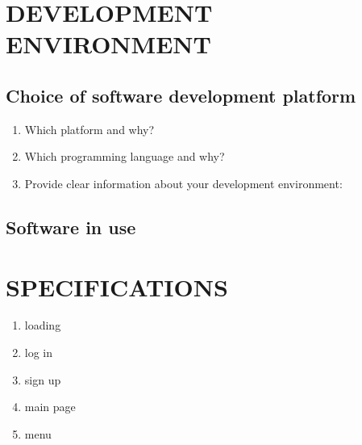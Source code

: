 \documentclass[conference]{IEEEtran}
\begin{document}
\section{DEVELOPMENT ENVIRONMENT}

\subsection{Choice of software development platform}
	\begin{enumerate}
	\item Which platform and why?\\
	
	\item Which programming language and why?\\
		
	\item Provide clear information about your development environment:\\
	
	\end{enumerate}
	
\subsection{Software in use}

\section{SPECIFICATIONS}
	\begin{enumerate}
	\item loading\\
	\item log in\\
	\item sign up\\
	\item main page\\
	\item menu\\
	
	\end{enumerate}
	
\begin{thebibliography}{00}
\end{thebibliography}
\end{document}
